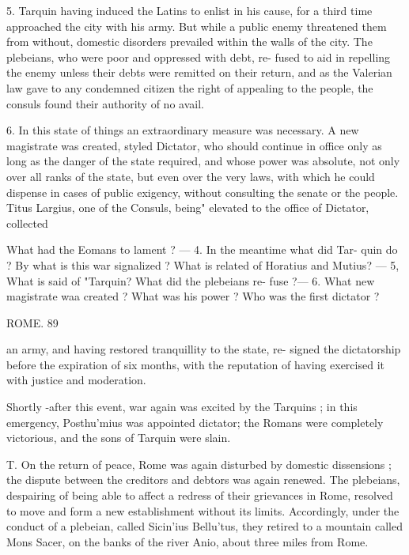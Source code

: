 \documentclass[openany,a4paper]{memoir}
\begin{document}
{5. Tarquin having induced the Latins to enlist in his 
cause, for a third time approached the city with his army. 
But while a public enemy threatened them from without, 
domestic disorders prevailed within the walls of the city. 
The plebeians, who were poor and oppressed with debt, re- 
fused to aid in repelling the enemy unless their debts were 
remitted on their return, and as the Valerian law gave to 
any condemned citizen the right of appealing to the people, 
the consuls found their authority of no avail. 

6. In this state of things an extraordinary measure was 
necessary. A new magistrate was created, styled Dictator, 
who should continue in office only as long as the danger of the 
state required, and whose power was absolute, not only over 
all ranks of the state, but even over the very laws, with 
which he could dispense in cases of public exigency, without 
consulting the senate or the people. Titus Largius, one of 
the Consuls, being" elevated to the office of Dictator, collected 

What had the Eomans to lament ? — 4. In the meantime what did Tar- 
quin do ? By what is this war signalized ? What is related of Horatius 
and Mutius? — 5, What is said of "Tarquin? What did the plebeians re- 
fuse ?— 6. What new magistrate waa created ? What was his power ? 
Who was the first dictator ? 



ROME. 89 

an army, and having restored tranquillity to the state, re- 
signed the dictatorship before the expiration of six months, 
with the reputation of having exercised it with justice and 
moderation. 

Shortly -after this event, war again was excited by the 
Tarquins ; in this emergency, Posthu'mius was appointed 
dictator; the Romans were completely victorious, and the 
sons of Tarquin were slain. 

T. On the return of peace, Rome was again disturbed by 
domestic dissensions ; the dispute between the creditors and 
debtors was again renewed. The plebeians, despairing of 
being able to affect a redress of their grievances in Rome, 
resolved to move and form a new establishment without its 
limits. Accordingly, under the conduct of a plebeian, called 
Sicin'ius Bellu'tus, they retired to a mountain called Mons 
Sacer, on the banks of the river Anio, about three miles 
from Rome. 

}
\end{document}
